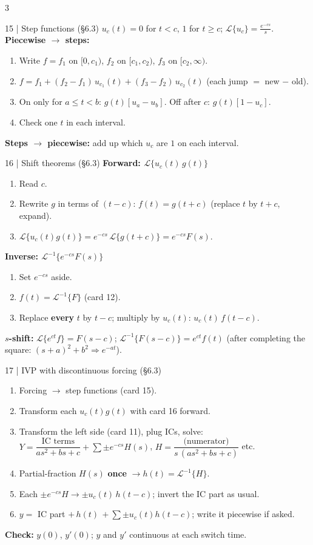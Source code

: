 \documentclass[8pt]{extarticle}
\newcommand{\key}[1]{\textcolor{grn}{\textbf{#1}}}
\newcommand{\chk}[1]{\par\textcolor{grn}{\textbf{Check:}} #1}
\newcommand{\Lap}{\mathcal{L}}
\newcommand{\Li}{\mathcal{L}^{-1}}
\begin{document}
\begin{multicols*}{3}
\begin{card}{15 \;|\; Step functions (\S6.3)}
$u_c(t)=0$ for $t<c$, $1$ for $t\ge c$; \;$\Lap\{u_c\}=\frac{e^{-cs}}s$.\\
\key{Piecewise $\to$ steps:}
\begin{enumerate}
\item Write $f=f_1$ on $[0,c_1)$, $f_2$ on $[c_1,c_2)$, $f_3$ on $[c_2,\infty)$.
\item $f=f_1+(f_2-f_1)\,u_{c_1}(t)+(f_3-f_2)\,u_{c_2}(t)$ (each jump $=$ new $-$ old).
\item On only for $a\le t<b$: $g(t)[u_a-u_b]$. Off after $c$: $g(t)[1-u_c]$.
\item Check one $t$ in each interval.
\end{enumerate}
\key{Steps $\to$ piecewise:} add up which $u_c$ are $1$ on each interval.
\end{card}

\begin{card}{16 \;|\; Shift theorems (\S6.3)}
\key{Forward: $\Lap\{u_c(t)\,g(t)\}$}
\begin{enumerate}
\item Read $c$. \;\item Rewrite $g$ in terms of $(t-c)$: $f(t)=g(t+c)$ (replace $t$ by $t+c$, expand).
\item $\Lap\{u_c(t)g(t)\}=e^{-cs}\,\Lap\{g(t+c)\}=e^{-cs}F(s)$.
\end{enumerate}
\key{Inverse: $\Li\{e^{-cs}F(s)\}$}
\begin{enumerate}
\item Set $e^{-cs}$ aside. \;\item $f(t)=\Li\{F\}$ (card 12).
\item Replace \textbf{every} $t$ by $t-c$; multiply by $u_c(t)$: \;$u_c(t)\,f(t-c)$.
\end{enumerate}
\key{$s$-shift:} $\Lap\{e^{ct}f\}=F(s-c)$; \;$\Li\{F(s-c)\}=e^{ct}f(t)$ (after completing the square: $(s+a)^2+b^2\Rightarrow e^{-at}$).
\end{card}

\begin{card}{17 \;|\; IVP with discontinuous forcing (\S6.3)}
\begin{enumerate}
\item Forcing $\to$ step functions (card 15).
\item Transform each $u_c(t)g(t)$ with card 16 forward.
\item Transform the left side (card 11), plug ICs, solve: $Y=\dfrac{\text{IC terms}}{as^2+bs+c}+\sum\pm e^{-cs}H(s)$, \;$H=\dfrac{\text{(numerator)}}{s\,(as^2+bs+c)}$ etc.
\item Partial-fraction $H(s)$ \textbf{once} $\to h(t)=\Li\{H\}$.
\item Each $\pm e^{-cs}H\to\pm u_c(t)\,h(t-c)$; invert the IC part as usual.
\item $y=$ IC part $+\,h(t)\,+\sum\pm u_c(t)h(t-c)$; write it piecewise if asked.
\end{enumerate}
\chk{$y(0)$, $y'(0)$; $y$ and $y'$ continuous at each switch time.}
\end{card}


\end{multicols*}
\end{document}
